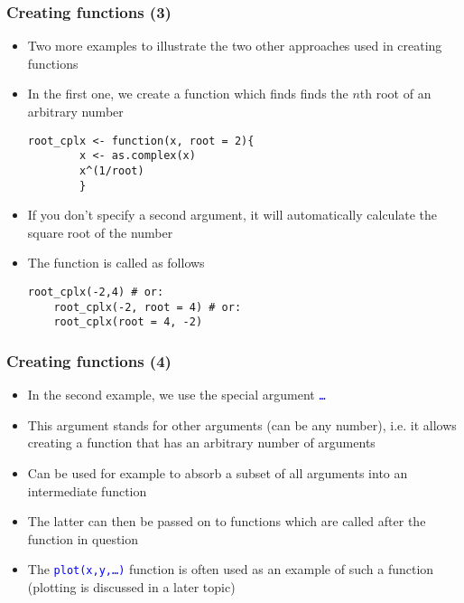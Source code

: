 \documentclass[10pt]{beamer}
\newcommand{\cc}[1]{\texttt{\textcolor{blue}{#1}}}
\theoremstyle{definition}
\begin{document}
\begin{frame}[fragile]
\frametitle{Creating functions (3)}
\begin{itemize}
	\item Two more examples to illustrate the two other approaches used in creating functions
	\item In the first one, we create a function which finds finds the $n$th root of an arbitrary number
	\begin{lstlisting}[style = rstyle, breaklines]
	root_cplx <- function(x, root = 2){
	 	x <- as.complex(x)
	 	x^(1/root)
	 	}
	\end{lstlisting}
	\item If you don't specify a second argument, it will automatically calculate the square root of the number
	\item The function is called as follows
	\begin{lstlisting}[style = rstyle, breaklines]
	root_cplx(-2,4) # or:
	root_cplx(-2, root = 4) # or:
	root_cplx(root = 4, -2)
	\end{lstlisting}
\end{itemize}
\end{frame}

\begin{frame}[fragile]
\frametitle{Creating functions (4)}
\begin{itemize}
	\item In the second example, we use the special argument \cc{\ldots}
	\item This argument stands for other arguments (can be any number), i.e. it allows creating a function that has an arbitrary number of arguments
	\item Can be used for example to absorb a subset of all arguments into an intermediate function
	\item The latter can then be passed on to functions which are called after the function in question
	\item The \cc{plot(x,y,\ldots)} function is often used as an example of such a function (plotting is discussed in a later topic)
\end{itemize}
\end{frame}
\end{document}
